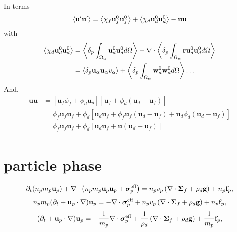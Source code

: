 \documentclass[12pt]{My_preprint}
\begin{document}
In terms
\begin{align*}
    \left< \textbf{u}'\textbf{u}'\right>
    = 
    \left<\chi_f \textbf{u}^0_f\textbf{u}^0_f\right>
    + \left<\chi_d \textbf{u}^0_d\textbf{u}^0_d\right>
    - \textbf{uu}
\end{align*}
with 
\begin{align*}
    \left<\chi_d \textbf{u}^0_d\textbf{u}^0_d\right>
    &= 
    \left<\delta_p \int_{\Omega_{\alpha}} \textbf{u}^0_d\textbf{u}^0_d d\Omega\right>
    -\mathbf{\nabla}\cdot \left<\delta_p \int_{\Omega_{\alpha}} \textbf{r}\textbf{u}^0_d\textbf{u}^0_d d\Omega\right>\\
    &= 
    \left<\delta_p \textbf{u}_\alpha\textbf{u}_\alpha v_\alpha\right>
    + \left<\delta_p \int_{\Omega_{\alpha}} \textbf{w}_d^0\textbf{w}^0_d d\Omega\right> \ldots
\end{align*}
And, 
\begin{align*}
    \textbf{uu} 
    &= 
    [\textbf{u}_f\phi_f + \phi_d \textbf{u}_d ] 
    [\textbf{u}_f + \phi_d( \textbf{u}_d - \textbf{u}_f)] \\
    &= 
    \phi_f \textbf{u}_f \textbf{u}_f
    + \phi_d [\textbf{u}_d \textbf{u}_f
    + \phi_f  \textbf{u}_f ( \textbf{u}_d - \textbf{u}_f)
    +  \textbf{u}_d \phi_d( \textbf{u}_d - \textbf{u}_f) ]\\
    &= 
    \phi_f \textbf{u}_f \textbf{u}_f
    + \phi_d [\textbf{u}_d \textbf{u}_f
    + \textbf{u} ( \textbf{u}_d - \textbf{u}_f)]\\
\end{align*}


\section*{particle phase }

\begin{equation*}
    \partial_t (n_p  m_p  \textbf{u}_p)
    + \mathbf{\nabla}\cdot \left(n_p m_p  \textbf{u}_p\textbf{u}_p
    +  \bm{\sigma}_p^{\text{eff}}\right)
    = 
    n_p v_p \left(\mathbf{\nabla}\cdot \bm{\Sigma}_f
    + \rho_d \textbf{g}\right)
    + n_p \textbf{f}_p, 
\end{equation*}
\begin{equation*}
    n_p m_p (\partial_t + \textbf{u}_p \cdot \mathbf{\nabla})  \textbf{u}_p
    = 
    -  \mathbf{\nabla}\cdot \bm{\sigma}_p^{\text{eff}}
    + n_p v_p \left(\mathbf{\nabla}\cdot \bm{\Sigma}_f
    + \rho_d \textbf{g}\right)
    + n_p \textbf{f}_p, 
\end{equation*}
\begin{equation*}
    (\partial_t + \textbf{u}_p \cdot \mathbf{\nabla})  \textbf{u}_p
    = 
    -  \frac{1}{m_p}\mathbf{\nabla}\cdot \bm{\sigma}_p^{\text{eff}}
    + \frac{1}{\rho_d} 
    \left(\mathbf{\nabla}\cdot \bm{\Sigma}_f + \rho_d \textbf{g}\right)
    + \frac{1}{m_p}\textbf{f}_p, 
\end{equation*}
\end{document}

